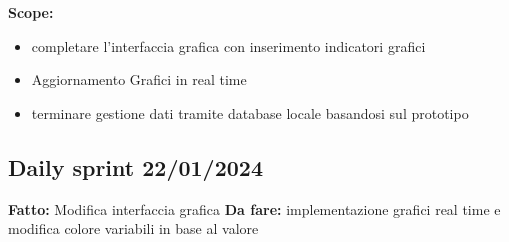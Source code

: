 \documentclass{report}
\begin{document}
\textbf{Scope:}
\begin{itemize}
\item completare l'interfaccia grafica con inserimento indicatori grafici
\item Aggiornamento Grafici in real time 
\item terminare gestione dati tramite database locale basandosi sul prototipo
\end{itemize}

\subsection{Daily sprint 22/01/2024}
\textbf{Fatto:} Modifica interfaccia grafica 
\textbf{Da fare:} implementazione grafici real time e modifica colore variabili in base al valore
\end{document}
